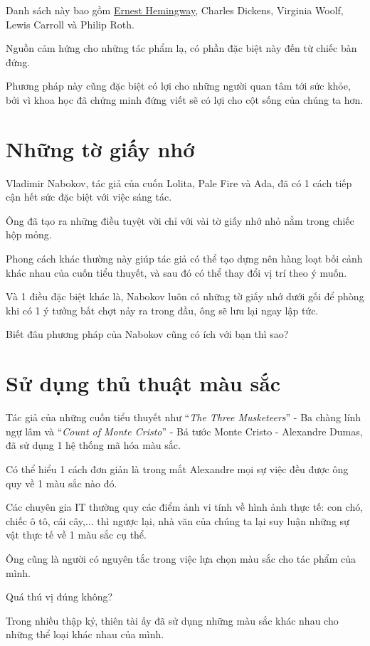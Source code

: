 \documentclass{book}
\numberwithin{equation}{section}
\begin{document}
Danh sách này bao gồm \href{http://tramdoc.vn/tin-tuc/25-cuon-sach-ma-nguoi-dan-ong-nao-cung-nen-doc-it-nhat-mot-lan-trong-doi-nZN4aW.html}{Ernest Hemingway}, Charles Dickens, Virginia Woolf, Lewis Carroll và Philip Roth.

Nguồn cảm hứng cho những tác phẩm lạ, có phần đặc biệt này đến từ chiếc bàn đứng.

Phương pháp này cũng đặc biệt có lợi cho những người quan tâm tới sức khỏe, bởi vì khoa học đã chứng minh đứng viết sẽ có lợi cho cột sống của chúng ta hơn.

\section{Những tờ giấy nhớ}
Vladimir Nabokov, tác giả của cuốn Lolita, Pale Fire và Ada, đã có 1 cách tiếp cận hết sức đặc biệt với việc sáng tác.

Ông đã tạo ra những điều tuyệt vời chỉ với vài tờ giấy nhớ nhỏ nằm trong chiếc hộp mỏng.

Phong cách khác thường này giúp tác giả có thể tạo dựng nên hàng loạt bối cảnh khác nhau của cuốn tiểu thuyết, và sau đó có thể thay đổi vị trí theo ý muốn.

Và  1 điều đặc biệt khác là, Nabokov luôn có những tờ giấy nhớ dưới gối để phòng khi có 1 ý tưởng bất chợt nảy ra trong đầu, ông sẽ lưu lại ngay lập tức. 

Biết đâu phương pháp của Nabokov cũng có ích với bạn thì sao?

\section{Sử dụng thủ thuật màu sắc}
Tác giả của những cuốn tiểu thuyết như  ``\textit{The Three Musketeers}'' - Ba chàng lính ngự lâm và ``\textit{Count of Monte Cristo}'' - Bá tước Monte Cristo - Alexandre Dumas, đã sử dụng 1 hệ thống mã hóa màu sắc.

Có thể hiểu 1 cách đơn giản là trong mắt Alexandre mọi sự việc đều được ông quy về 1 màu sắc nào đó.

Các chuyên gia IT thường quy các điểm ảnh vi tính về hình ảnh thực tế: con chó, chiếc ô tô, cái cây,$\ldots$ thì ngược lại, nhà văn của chúng ta lại suy luận những sự vật thực tế về 1 màu sắc cụ thể. 

Ông cũng là người có nguyên tắc trong việc lựa chọn màu sắc cho tác phẩm của mình.

Quá thú vị đúng không?

Trong nhiều thập kỷ, thiên tài ấy đã sử dụng những màu sắc khác nhau cho những thể loại khác nhau của mình.
\end{document}
